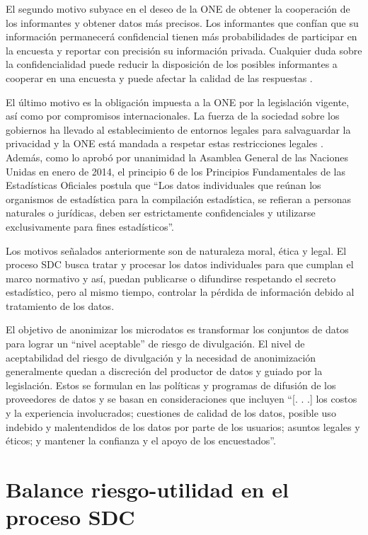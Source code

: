 \documentclass[
]{book}
\theoremstyle{definition}
\theoremstyle{definition}
\theoremstyle{definition}
\theoremstyle{definition}
\theoremstyle{remark}
\begin{document}
El segundo motivo subyace en el deseo de la ONE de obtener la cooperación de los informantes y obtener datos más precisos. Los informantes que confían que su información permanecerá confidencial tienen más probabilidades de participar en la encuesta y reportar con precisión su información privada. Cualquier duda sobre la confidencialidad puede reducir la disposición de los posibles informantes a cooperar en una encuesta y puede afectar la calidad de las respuestas \citep{Yazdani}.

El último motivo es la obligación impuesta a la ONE por la legislación vigente, así como por compromisos internacionales. La fuerza de la sociedad sobre los gobiernos ha llevado al establecimiento de entornos legales para salvaguardar la privacidad y la ONE está mandada a respetar estas restricciones legales \citep{Duncan}. Además, como lo aprobó por unanimidad la Asamblea General de las Naciones Unidas en enero de 2014, el principio 6 de los Principios Fundamentales de las Estadísticas Oficiales postula que ``Los datos individuales que reúnan los organismos de estadística para la compilación estadística, se refieran a personas naturales o jurídicas, deben ser estrictamente confidenciales y utilizarse exclusivamente para fines estadísticos''.

Los motivos señalados anteriormente son de naturaleza moral, ética y legal. El proceso SDC busca tratar y procesar los datos individuales para que cumplan el marco normativo y así, puedan publicarse o difundirse respetando el secreto estadístico, pero al mismo tiempo, controlar la pérdida de información debido al tratamiento de los datos.

El objetivo de anonimizar los microdatos es transformar los conjuntos de datos para lograr un ``nivel aceptable'' de riesgo de divulgación. El nivel de aceptabilidad del riesgo de divulgación y la necesidad de anonimización generalmente quedan a discreción del productor de datos y guiado por la legislación. Estos se formulan en las políticas y programas de difusión de los proveedores de datos y se basan en consideraciones que incluyen ``{[}. . .{]} los costos y la experiencia involucrados; cuestiones de calidad de los datos, posible uso indebido y malentendidos de los datos por parte de los usuarios; asuntos legales y éticos; y mantener la confianza y el apoyo de los encuestados''\citep[p.~33]{benschop}.

\hypertarget{balance-riesgo-utilidad-en-el-proceso-sdc}{%
\section{Balance riesgo-utilidad en el proceso SDC}\label{balance-riesgo-utilidad-en-el-proceso-sdc}}
\end{document}
